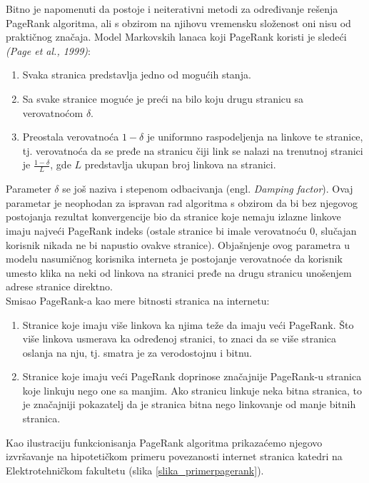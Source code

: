 \documentclass[12pt, journal, compsoc]{IEEEtran}
\begin{document}
Bitno je napomenuti da postoje i neiterativni metodi za određivanje rešenja PageRank algoritma, ali s obzirom na njihovu vremensku složenost oni nisu od praktičnog značaja.  
\newline \newline
Model Markovskih lanaca koji PageRank koristi je sledeći \textit{(Page et al., 1999)}:
\begin{enumerate}
\item
Svaka stranica predstavlja jedno od mogućih stanja.
\item
Sa svake stranice moguće je preći na bilo koju drugu stranicu sa verovatnoćom $\delta$.
\item
Preostala verovatnoća $1 - \delta$ je uniformno raspodeljenja na linkove te stranice, tj. verovatnoća da se pređe na stranicu čiji link se nalazi na trenutnoj stranici je $\frac{1-\delta}{L}$, gde $L$ predstavlja ukupan broj linkova na stranici.
\end{enumerate}

Parameter $\delta$ se još naziva i stepenom odbacivanja (engl. \textit{Damping factor}). Ovaj parametar je neophodan za ispravan rad algoritma s obzirom da bi bez njegovog postojanja rezultat konvergencije bio da stranice koje nemaju izlazne linkove imaju najveći PageRank indeks (ostale stranice bi imale verovatnoću 0, slučajan korisnik nikada ne bi napustio ovakve stranice). Objašnjenje ovog parametra u modelu nasumičnog korisnika interneta je postojanje verovatnoće da korisnik umesto klika na neki od linkova na stranici pređe na drugu stranicu unošenjem adrese stranice direktno.
 \\
Smisao PageRank-a kao mere bitnosti stranica na internetu:
\begin{enumerate}
\item
Stranice koje imaju više linkova ka njima teže da imaju veći PageRank. Što više linkova usmerava ka određenoj stranici, to znaci da se više stranica oslanja na nju, tj. smatra je za verodostojnu i bitnu.
\item
Stranice koje imaju veći PageRank doprinose značajnije PageRank-u stranica koje linkuju nego one sa manjim. Ako stranicu linkuje neka bitna stranica, to je značajniji pokazatelj da je stranica bitna nego linkovanje od manje bitnih stranica.
\end{enumerate}

Kao ilustraciju funkcionisanja PageRank algoritma prikazaćemo njegovo izvršavanje na hipotetičkom primeru povezanosti internet stranica katedri na Elektrotehničkom fakultetu (slika \ref{slika_primerpagerank}).
\end{document}
